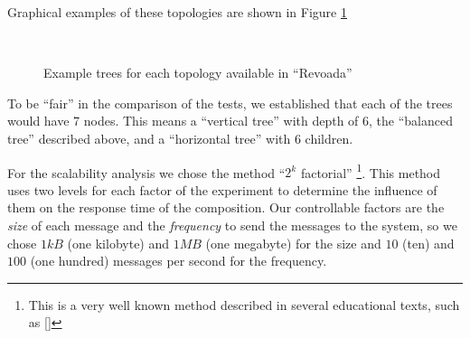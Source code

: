 Graphical examples of these topologies are shown in Figure \ref{trees}

\begin{figure}[htb]
	\centering
	 \qquad
	 \\
	\caption{Example trees for each topology available in ``Revoada''}%
	\label{trees}
\end{figure}


To be ``fair'' in the comparison of the tests, we established that each of the trees would have 7 nodes. This means a ``vertical tree'' with depth of 6, the ``balanced tree'' described above, and a ``horizontal tree'' with 6 children.



For the scalability analysis we chose the method ``$2^k$ factorial'' \footnote{This is a very well known method described in several educational texts, such as [\citet{SMA}]}. This method uses two levels for each factor of the experiment to determine the influence of them on the response time of the composition. Our controllable factors are the \emph{size} of each message and the \emph{frequency} to send the messages to the system, so we chose $1 kB$ (one kilobyte) and $1 MB$ (one megabyte) for the size and $10$ (ten) and $100$ (one hundred) messages per second for the frequency.

